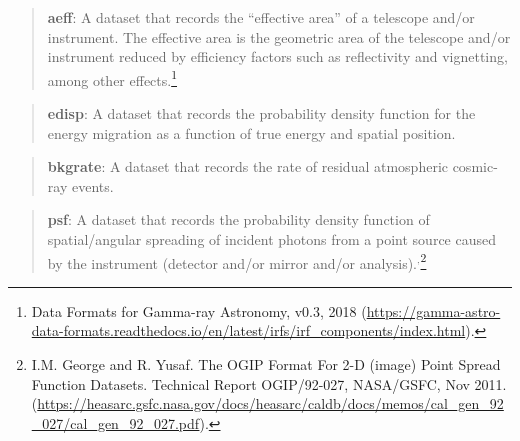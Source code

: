 \documentclass[11pt,a4paper]{ivoa}
\begin{document}

\begin{quote}
{\bf aeff}: A dataset that records the ``effective area'' of a telescope and/or instrument.  The effective area is the geometric area of the telescope and/or instrument reduced by efficiency factors such as reflectivity and vignetting, among other effects.\footnote{\label{fn:dfgamma}Data Formats for Gamma-ray Astronomy, v0.3, 2018 (\url{https://gamma-astro-data-formats.readthedocs.io/en/latest/irfs/irf_components/index.html}).}
\end{quote}

\begin{quote}
{\bf edisp}: A dataset that records the probability density function for the energy migration as a function of true energy and spatial position.
\end{quote}

\begin{quote}
{\bf bkgrate}: A dataset that records the rate of residual atmospheric cosmic-ray events.
\end{quote}

\begin{quote}
{\bf psf}: A dataset that records the probability density function of spatial/angular spreading of incident photons from a point source caused by the instrument (detector and/or mirror and/or analysis).$^{,}$\footnote{I.M. George and R. Yusaf. The OGIP Format For 2-D (image) Point Spread Function Datasets. Technical Report OGIP/92-027, NASA/GSFC, Nov 2011. (\url{https://heasarc.gsfc.nasa.gov/docs/heasarc/caldb/docs/memos/cal_gen_92_027/cal_gen_92_027.pdf}).}
\end{quote}
\end{document}
